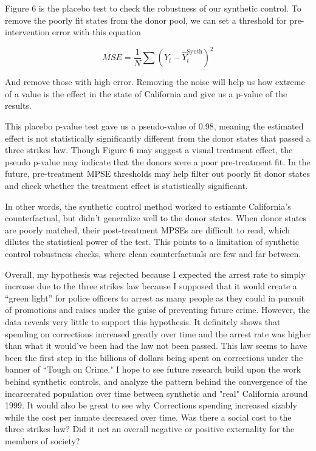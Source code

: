 \documentclass[12pt]{article}
\begin{document}
    Figure 6 is the placebo test to check the robustness of our synthetic control. To remove the poorly fit states from the donor pool, we can set a threshold for pre-intervention error with this equation

\begin{equation*}
MSE = \frac{1}{N} \sum \left( Y_t - \hat{Y}_t^{\text{Synth}} \right)^2
\end{equation*}

    And remove those with high error. Removing the noise will help us how extreme of a value is the effect in the state of California and give us a p-value of the results.
    
    This placebo p-value test gave us a pseudo-value of 0.98, meaning the estimated effect is not statistically significantly different from the donor states that passed a three strikes law. Though Figure 6 may suggest a visual treatment effect, the pseudo p-value may indicate that the donors were a poor pre-treatment fit. In the future, pre-treatment MPSE thresholds may help filter out poorly fit donor states and check whether the treatment effect is statistically significant.

    In other words, the synthetic control method worked to estiamte California's counterfactual, but didn't generalize well to the donor states. When donor states are poorly matched, their post-treatment MPSEs are difficult to read, which dilutes the statistical power of the test. This points to a limitation of synthetic control robustness checks, where clean counterfactuals are few and far between.

    Overall, my hypothesis was rejected because I expected the arrest rate to simply increase due to the three strikes law because I supposed that it would create a “green light” for police officers to arrest as many people as they could in pursuit of promotions and raises under the guise of preventing future crime. However, the data reveals very little to support this hypothesis. It definitely shows that spending on corrections increased greatly over time and the arrest rate was higher than what it would've been had the law not been passed. This law seems to have been the first step in the billions of dollars being spent on corrections under the banner of ``Tough on Crime." I hope to see future research build upon the work behind synthetic controls, and analyze the pattern behind the convergence of the incarcerated population over time between synthetic and "real" California around 1999. It would also be great to see why Corrections spending increased sizably while the cost per inmate decreased over time. Was there a social cost to the three strikes law? Did it net an overall negative or positive externality for the members of society?
\end{document}
